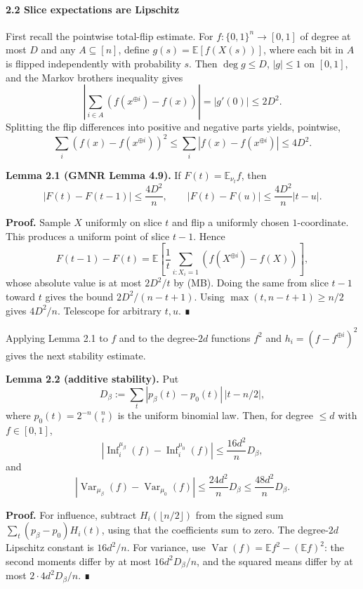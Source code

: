 \paragraph{2.2 Slice expectations are Lipschitz}\label{slice-expectations-are-lipschitz}

First recall the pointwise total-flip estimate. For \(f:\{0,1\}^n\to[0,1]\) of degree at most \(D\) and any \(A\subseteq[n]\), define \(g(s)=\mathbb E[f(X(s))]\), where each bit in \(A\) is flipped independently with probability \(s\). Then \(\deg g\le D\), \(|g|\le1\) on \([0,1]\), and the Markov brothers inequality gives
\[
\left|\sum_{i\in A}(f(x^{\oplus i})-f(x))\right|=|g'(0)|
\le2D^2. \tag{MB}
\]
Splitting the flip differences into positive and negative parts yields, pointwise,
\[
\sum_i(f(x)-f(x^{\oplus i}))^2
\le\sum_i|f(x)-f(x^{\oplus i})|\le4D^2. \tag{TF}
\]

\textbf{Lemma 2.1 (GMNR Lemma 4.9).} If \(F(t)=\mathbb E_{\nu_t}f\), then
\[|F(t)-F(t-1)|\le\frac{4D^2}{n},
\qquad |F(t)-F(u)|\le\frac{4D^2}{n}|t-u|.\]

\textbf{Proof.} Sample \(X\) uniformly on slice \(t\) and flip a uniformly chosen \(1\)-coordinate. This produces a uniform point of slice \(t-1\). Hence
\[F(t-1)-F(t)=\mathbb E\!\left[\frac1t\sum_{i:X_i=1}(f(X^{\oplus i})-f(X))\right],\]
whose absolute value is at most \(2D^2/t\) by (MB). Doing the same from slice \(t-1\) toward \(t\) gives the bound \(2D^2/(n-t+1)\). Using \(\max(t,n-t+1)\ge n/2\) gives \(4D^2/n\). Telescope for arbitrary \(t,u\). ∎

Applying Lemma 2.1 to \(f\) and to the degree-\(2d\) functions \(f^2\) and \(h_i=(f-f^{\oplus i})^2\) gives the next stability estimate.

\textbf{Lemma 2.2 (additive stability).} Put
\[D_\beta:=\sum_t|p_\beta(t)-p_0(t)|\,|t-n/2|,\]
where \(p_0(t)=2^{-n}\binom nt\) is the uniform binomial law. Then, for degree \(\le d\) with \(f\in[0,1]\),
\[
|\operatorname{Inf}_i^{\mu_\beta}(f)-\operatorname{Inf}_i^{\mu_0}(f)|
\le\frac{16d^2}{n}D_\beta,
\]
and
\[
|\operatorname{Var}_{\mu_\beta}(f)-\operatorname{Var}_{\mu_0}(f)|
\le\frac{24d^2}{n}D_\beta
\le\frac{48d^2}{n}D_\beta.
\]

\textbf{Proof.} For influence, subtract \(H_i(\lfloor n/2\rfloor)\) from the signed sum \(\sum_t(p_\beta-p_0)H_i(t)\), using that the coefficients sum to zero. The degree-\(2d\) Lipschitz constant is \(16d^2/n\). For variance, use \(\operatorname{Var}(f)=\mathbb E f^2-(\mathbb E f)^2\): the second moments differ by at most \(16d^2D_\beta/n\), and the squared means differ by at most \(2\cdot4d^2D_\beta/n\). ∎

